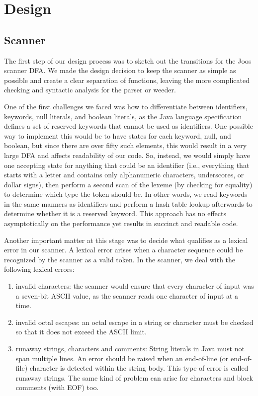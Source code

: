\chapter{Design}
\section{Scanner}
The first step of our design process was to sketch out the transitions for the Joos scanner DFA. We made the design decision to keep the scanner as simple as possible and create a clear separation of functions, leaving the more complicated checking and syntactic analysis for the parser or weeder. 

One of the first challenges we faced was how to differentiate between identifiers, keywords, null literals, and boolean literals, as the Java language specification defines a set of reserved keywords that cannot be used as identifiers. One possible way to implement this would be to have states for each keyword, null, and boolean,
  but since there are over fifty such elements, this would result in a very large DFA and affects readability of our code.
So, instead, we would simply have one accepting state for anything that could be an identifier
  (i.e., everything that starts with a letter and contains only alphanumeric characters, underscores, or dollar signs),
  then perform a second scan of the lexeme (by checking for equality) to determine which type the token should be. In other words, we read keywords in the same manners as identifiers and perform a hash table lookup afterwards to determine whether it is a reserved keyword. This approach has no effects asymptotically on the performance yet results in succinct and readable code.

Another important matter at this stage was to decide what qualifies as a lexical error in our scanner. A lexical error arises when a character sequence could be recognized by the scanner as a valid token. In the scanner, we deal with the following lexical errors:
\begin{enumerate}
	\item invalid characters: the scanner would ensure that every character of input was a seven-bit ASCII value,
  as the scanner reads one character of input at a time.
	\item invalid octal escapes: an octal escape in a string or character must be checked so that it does not exceed the ASCII limit. 
	\item runaway strings, characters and comments: String literals in Java must not span multiple lines. An error should be raised when an end-of-line (or end-of-file) character is detected within the string body. This type of error is called runaway strings. The same kind of problem can arise for characters and block comments (with EOF) too. 
\end{enumerate}


